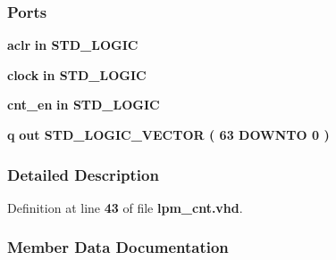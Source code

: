 \subsubsection*{Ports}
 \begin{DoxyCompactItemize}
\item 
{\bf aclr}  {\bfseries {\bfseries \textcolor{keywordflow}{in}\textcolor{vhdlchar}{ }}} {\bfseries \textcolor{comment}{S\+T\+D\+\_\+\+L\+O\+G\+IC}\textcolor{vhdlchar}{ }} 
\item 
{\bf clock}  {\bfseries {\bfseries \textcolor{keywordflow}{in}\textcolor{vhdlchar}{ }}} {\bfseries \textcolor{comment}{S\+T\+D\+\_\+\+L\+O\+G\+IC}\textcolor{vhdlchar}{ }} 
\item 
{\bf cnt\+\_\+en}  {\bfseries {\bfseries \textcolor{keywordflow}{in}\textcolor{vhdlchar}{ }}} {\bfseries \textcolor{comment}{S\+T\+D\+\_\+\+L\+O\+G\+IC}\textcolor{vhdlchar}{ }} 
\item 
{\bf q}  {\bfseries {\bfseries \textcolor{keywordflow}{out}\textcolor{vhdlchar}{ }}} {\bfseries \textcolor{comment}{S\+T\+D\+\_\+\+L\+O\+G\+I\+C\+\_\+\+V\+E\+C\+T\+OR}\textcolor{vhdlchar}{ }\textcolor{vhdlchar}{(}\textcolor{vhdlchar}{ }\textcolor{vhdlchar}{ } \textcolor{vhdldigit}{63} \textcolor{vhdlchar}{ }\textcolor{keywordflow}{D\+O\+W\+N\+TO}\textcolor{vhdlchar}{ }\textcolor{vhdlchar}{ } \textcolor{vhdldigit}{0} \textcolor{vhdlchar}{ }\textcolor{vhdlchar}{)}\textcolor{vhdlchar}{ }} 
\end{DoxyCompactItemize}


\subsubsection{Detailed Description}


Definition at line {\bf 43} of file {\bf lpm\+\_\+cnt.\+vhd}.



\subsubsection{Member Data Documentation}
\paragraph[{ all }]{\hspace{0.3cm}{\ttfamily [Package]}}\label{classlpm__cnt_a470a86ce8776f637b0483eabf2d92ad2}


